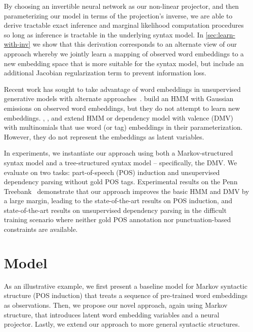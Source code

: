 \documentclass[11pt,a4paper]{article}
\begin{document}
By choosing an invertible neural network as our non-linear projector, and then parameterizing our model in terms of the projection's inverse, we are able to derive tractable exact inference and marginal likelihood computation procedures so long as inference is tractable in the underlying syntax model.  In \cref{sec:learn-with-inv} we show that this derivation corresponds to an alternate view of our approach whereby we jointly learn a mapping of observed word embeddings to a new embedding space that is more suitable for the syntax model, but include an additional Jacobian regularization term to prevent information loss. 

Recent work has sought to take advantage of word embeddings in unsupervised generative models with alternate approaches~\citep{lin2015unsupervised, tran2016unsupervised, jiang2016unsupervised, han2017dependency}. \citet{lin2015unsupervised} build an HMM with Gaussian emissions on observed word embeddings, but they do not attempt to learn new embeddings.  \citet{tran2016unsupervised}, \citet{jiang2016unsupervised}, and \citet{han2017dependency} extend HMM or dependency model with valence (DMV)~\citep{klein2004corpus} with multinomials that use word (or tag) embeddings in their parameterization. However, they do not represent the embeddings as latent variables. 

In experiments, we instantiate our approach using both a Markov-structured syntax model and a tree-structured syntax model -- specifically, the DMV. We evaluate on two tasks: part-of-speech (POS) induction and unsupervised dependency parsing without gold POS tags. Experimental results on the Penn Treebank~\citep{marcus1993building} demonstrate that our approach improves the basic HMM and DMV by a large margin, leading to the state-of-the-art results on POS induction, and state-of-the-art results on unsupervised dependency parsing in the difficult training scenario where neither gold POS annotation nor punctuation-based constraints are available. 




\vspace{-0.4em}
\section{Model}
\vspace{-0.4em}
\label{sec:model}
As an illustrative example, we first present a baseline model for Markov syntactic structure (POS induction) that treats a sequence of pre-trained word embeddings as observations. Then, we propose our novel approach, again using Markov structure, that introduces latent word embedding variables and a neural projector. Lastly, we extend our approach to more general syntactic structures.
\end{document}
